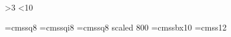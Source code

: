 \ifnum{}
  \@dst@in@oct@or@mar 
\else
  \ifnum\month>3
    \ifnum\month<10
      \dsttrue
    \else
      \ifnum{}
        \@dst@in@oct@or@mar
      \fi
    \fi
  \fi
\fi

\def\isotz{%
-\ifdst700\else800\fi} %

\def\isotime{\begingroup%
  \count0 = \time\divide\count0 by 60 %
  \count2 = \count0 %
  \count4 = \time\multiply\count0 by 60 %
  \advance\count4 by -\count0 %
  \pad@one@zero{\count2}:\pad@one@zero{\count4}:00\isotz %
\endgroup}

\def\isodatetime{\isodate T\isotime}

\def\@maketitleaddenda{\mbox{Compiled: {\tt\isodatetime}}}


\def\@journal[#1]#2{\emph{\frenchspacing#1}}
\def\@@journal#1{\@journal[#1]{}}
\def\journal{\@ifnextchar[\@journal\@@journal}
\def\volume{\textbf}

\font\eightss=cmssq8
\font\eightssi=cmssqi8
\font\sixss=cmssq8 scaled 800
\font\tenssbx=cmssbx10
\font\twelvess=cmss12


\def\chapterquotes{
  \baselineskip 10pt
  \parfillskip \z@
  \interlinepenalty 10000
  \leftskip \z@ plus 40pc minus \parindent
  \let\rm=\eightss \let\sl=\eightssi \let\adbcfont=\sixss \let\em=\sl
  \everypar{\sl}
  \def\from{\par\nobreak\smallskip\noindent\rm--- }
  \def\author##1(##2){\from ##1\unskip\enspace(##2)}
  \def\\{\hskip.05em} %
  \obeylines}
\def\endchapterquotes{}




\def\thetheorem{\thesection.\arabic{theorem}}


